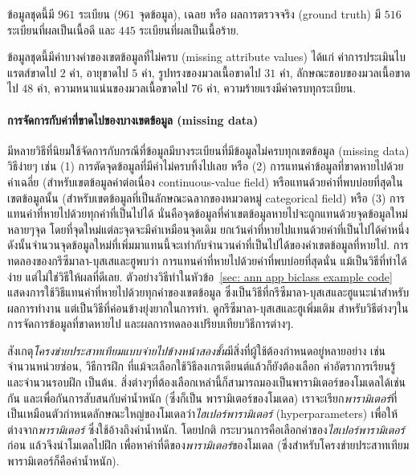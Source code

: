ข้อมูลชุดนี้มี $961$ ระเบียน ($961$ จุดข้อมูล),
เฉลย หรือ ผลการตรวจจริง (ground truth) มี $516$ ระเบียนที่ผลเป็นเนื้อดี และ $445$ ระเบียนที่ผลเป็นเนื้อร้าย.

ข้อมูลชุดนี้มีค่าบางค่าของเขตข้อมูลที่ไม่ครบ (missing attribute values) ได้แก่
ค่าการประเมินไบแรตส์ขาดไป $2$ ค่า, 
อายุขาดไป $5$ ค่า, 
รูปทรงของมวลเนื้อขาดไป $31$ ค่า,
ลักษณะขอบของมวลเนื้อขาดไป $48$ ค่า, 
ความหนาแน่นของมวลเนื้อขาดไป $76$ ค่า, 
ความร้ายแรงมีค่าครบทุกระเบียน.

\paragraph{การจัดการกับค่าที่ขาดไปของบางเขตข้อมูล (missing data)}

มีหลายวิธีที่นิยมใช้จัดการกับกรณีที่ข้อมูลมีบางระเบียนที่มีข้อมูลไม่ครบทุกเขตข้อมูล (missing data)
วิธีง่ายๆ เช่น 
(1) การตัดจุดข้อมูลที่มีค่าไม่ครบทิ้งไปเลย %
หรือ (2) การแทนค่าข้อมูลที่ขาดหายไปด้วยค่าเฉลี่ย (สำหรับเขตข้อมูลค่าต่อเนื่อง continuous-value field) หรือแทนด้วยค่าที่พบบ่อยที่สุดในเขตข้อมูลนั้น (สำหรับเขตข้อมูลที่เป็นลักษณะฉลากของหมวดหมู่ categorical field)
หรือ (3) การแทนค่าที่หายไปด้วยทุกค่าที่เป็นไปได้ %
นั่นคือจุดข้อมูลที่ค่าเขตข้อมูลหายไปจะถูกแทนด้วยจุดข้อมูลใหม่หลายๆจุด โดยที่จุดใหม่แต่ละจุดจะมีค่าเหมือนจุดเดิม ยกเว้นค่าที่หายไปแทนด้วยค่าที่เป็นไปได้ค่าหนึ่ง
ดังนั้นจำนวนจุดข้อมูลใหม่ที่เพิ่มมาแทนนี้จะเท่ากับจำนวนค่าที่เป็นไปได้ของค่าเขตข้อมูลที่หายไป.
การทดลองของกรึซีมาลา-บุสเสและฮู\cite{Grzymala-BusseHu2000a}พบว่า 
การแทนค่าที่หายไปด้วยค่าที่พบบ่อยที่สุดนั่น แม้เป็นวิธีที่ทำได้ง่าย แต่ไม่ใช่วิธีให้ผลที่ดีเลย.
ตัวอย่างวิธีทำในหัวข้อ~\ref{sec: ann app biclass example code} แสดงการใช้วิธีแทนค่าที่หายไปด้วยทุกค่าของเขตข้อมูล ซึ่งเป็นวิธีที่กรึซีมาลา-บุสเสและฮูแนะนำสำหรับผลการทำงาน 
แต่เป็นวิธีที่ค่อนข้างยุ่งยากในการทำ.
ดูกรึซีมาลา-บุสเสและฮู\cite{Grzymala-BusseHu2000a}เพิ่มเติม 
สำหรับวิธีต่างๆในการจัดการข้อมูลที่ขาดหายไป 
และผลการทดลองเปรียบเทียบวิธีการต่างๆ.

สังเกตุ\textit{โครงข่ายประสาทเทียมแบบจ่ายไปข้างหน้าสองชั้น}มีสิ่งที่ผู้ใช้ต้องกำหนดอยู่หลายอย่าง 
เช่น จำนวนหน่วยซ่อน, วิธีการฝึก ที่แม้จะเลือกใช้วิธีลงเกรเดียนต์แล้วก็ยังต้องเลือก ค่าอัตราการเรียนรู้ และจำนวนรอบฝึก เป็นต้น.
สิ่งต่างๆที่ต้องเลือกเหล่านี้ก็สามารถมองเป็นพารามิเตอร์ของโมเดลได้เช่นกัน
และเพื่อกันการสับสนกับค่าน้ำหนัก (ซึ่งก็เป็น พารามิเตอร์ของโมเดล) 
เราจะเรียก\textit{พารามิเตอร์}ที่เป็นเหมือนตัวกำหนดลักษณะใหญ่ของโมเดลว่า\textit{ไฮเปอร์พารามิเตอร์} (hyperparameters)  เพื่อให้ต่างจาก\textit{พารามิเตอร์} ซึ่งใช้อ้างถึงค่าน้ำหนัก.
โดยปกติ กระบวนการคือเลือกค่าของ\textit{ไฮเปอร์พารามิเตอร์}ก่อน
แล้วจึงนำโมเดลไปฝึก เพื่อหาค่าที่ดีของ\textit{พารามิเตอร์}ของโมเดล (ซึ่งสำหรับโครงข่ายประสาทเทียมพารามิเตอร์ก็คือค่าน้ำหนัก).

